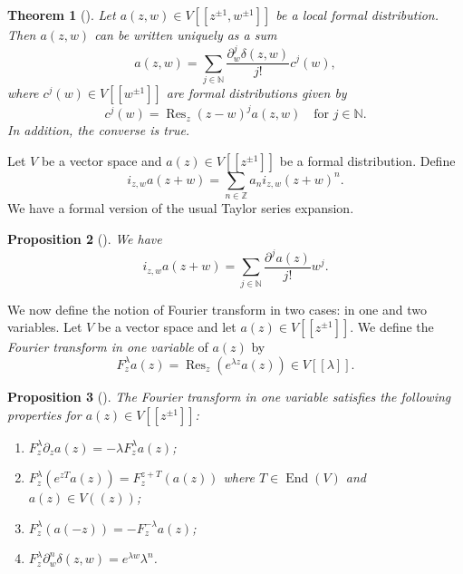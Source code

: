 \documentclass[a4paper, 12pt, reqno]{amsart}
\newtheorem{theorem}{Theorem}[section]
\newtheorem{proposition}[theorem]{Proposition}
\theoremstyle{remark}
\numberwithin{equation}{subsection}
\DeclareMathOperator{\End}{End}
\DeclareMathOperator{\Res}{Res}
\begin{document}
\begin{theorem}[{\cite[Proposition 2.2]{kac_vertex_1998}}]
  \label{thr:6}
  Let $a(z, w) \in V[[z^{\pm 1}, w^{\pm 1}]]$ be a local formal distribution.
  Then $a(z, w)$ can be written uniquely as a sum
  \begin{equation*}
    a(z, w) = \sum_{j \in \mathbb{N}}\frac{\partial_w^j\delta(z, w)}{j!}c^j(w),
  \end{equation*}
  where $c^j(w) \in V[[w^{\pm 1}]]$ are formal distributions given by
  \begin{equation*}
    c^j(w) = \Res_z(z - w)^ja(z, w) \quad \text{for }j \in \mathbb{N}.
  \end{equation*}
  In addition, the converse is true.
\end{theorem}

Let $V$ be a vector space and  $a(z) \in V[[z^{\pm 1}]]$ be a formal distribution.
Define
\begin{equation*}
  i_{z, w}a(z + w) = \sum_{n \in \mathbb{Z}} a_ni_{z, w}(z + w)^n.
\end{equation*}
We have a formal version of the usual Taylor series expansion.

\begin{proposition}[{\cite[Proposition 3.4.1]{nozaradan_introduction_2008}}]
  \label{prp:1}
  We have
  \begin{equation*}
    i_{z, w}a(z + w) = \sum_{j \in \mathbb{N}}\frac{\partial^ja(z)}{j!}w^j.
  \end{equation*}
\end{proposition}

We now define the notion of Fourier transform in two cases: in one and two variables. Let $V$ be a vector space and let $a(z) \in V[[z^{\pm 1}]]$.
We define the \emph{Fourier transform in one variable} of $a(z)$ by
\begin{equation*}
  F^{\lambda}_za(z) = \Res_z(e^{\lambda z}a(z)) \in V[[\lambda]].
\end{equation*}

\begin{proposition}[{\cite[Proposition 1.5.2]{nozaradan_introduction_2008}}]
  \label{prp:2}
  The Fourier transform in one variable satisfies the following properties for $a(z) \in V[[z^{\pm 1}]]$:
  \begin{enumerate}
  \item $F^{\lambda}_z\partial_za(z) = -\lambda F^{\lambda}_za(z)$;
  \item $F^{\lambda}_z(e^{zT}a(z)) = F^{z + T}_z(a(z))$ where $T \in \End(V)$ and $a(z) \in V((z))$;
  \item $F^{\lambda}_z(a(-z)) = -F^{-\lambda}_za(z)$;
  \item $F^{\lambda}_z\partial^n_w\delta(z, w) = e^{\lambda w}\lambda^n$.
  \end{enumerate}
\end{proposition}
\end{document}
